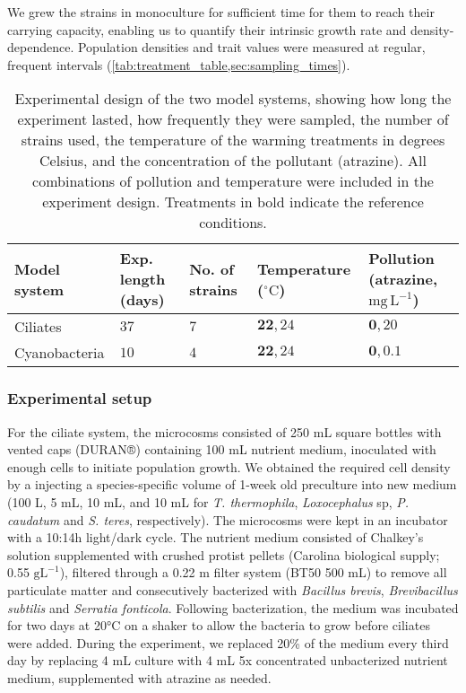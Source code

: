 \documentclass{article}
\begin{document}
We grew the strains in monoculture for sufficient time for them to reach their carrying capacity, enabling us to quantify their intrinsic growth rate and density-dependence. Population densities and trait values were measured at regular, frequent intervals (\cref{tab:treatment_table,sec:sampling_times}).

\begin{table}[H]
    \centering
    \caption{Experimental design of the two model systems, showing how long the experiment lasted, how frequently they were sampled, the number of strains used, the temperature of the warming treatments in degrees Celsius, and the concentration of the pollutant (atrazine). All combinations of pollution and temperature were included in the experiment design. Treatments in bold indicate the reference conditions.}
    \begin{tabular}{|m{2.5cm}|m{2cm}|m{2.5cm}|m{3cm}|m{3cm}|}
        \hline
        Model system & Exp. length (days) & No. of strains & Temperature ($\mathrm{^\circ C}$) & Pollution (atrazine, $\mathrm{mg\,L}^{-1}$) \\
        \hline
        Ciliates & $37$ & $7$ & $\bm{22}, 24$ & $\bm{0}, 20$ \\
        Cyanobacteria & $10$ & $4$ & $\bm{22}, 24$ & $\bm{0}, 0.1$ \\
        \hline
    \end{tabular}
    \label{tab:treatment_table}
\end{table}

\subsubsection{Experimental setup}

For the ciliate system, the microcosms consisted of 250 mL square bottles with vented caps (DURAN®) containing 100 mL nutrient medium, inoculated with enough cells to initiate population growth. We obtained the required cell density by a injecting a species-specific volume of 1-week old preculture into new medium (100 \textmu L, 5 mL, 10 mL, and 10 mL for \textit{T. thermophila}, \textit{Loxocephalus} sp, \textit{P. caudatum} and \textit{S. teres}, respectively). The microcosms were kept in an incubator with a 10:14h light/dark cycle. The nutrient medium consisted of Chalkey’s solution supplemented with crushed protist pellets (Carolina biological supply; 0.55 $\mathrm{gL}^{-1}$), filtered through a 0.22 \textmu m filter system (BT50 500 mL) to remove all particulate matter and consecutively bacterized with \textit{Bacillus brevis}, \textit{Brevibacillus subtilis} and \textit{Serratia fonticola}. Following bacterization, the medium was incubated for two days at 20°C on a shaker to allow the bacteria to grow before ciliates were added. During the experiment, we replaced 20\% of the medium every third day by replacing 4 mL culture with 4 mL 5x concentrated unbacterized nutrient medium, supplemented with atrazine as needed.
\end{document}
